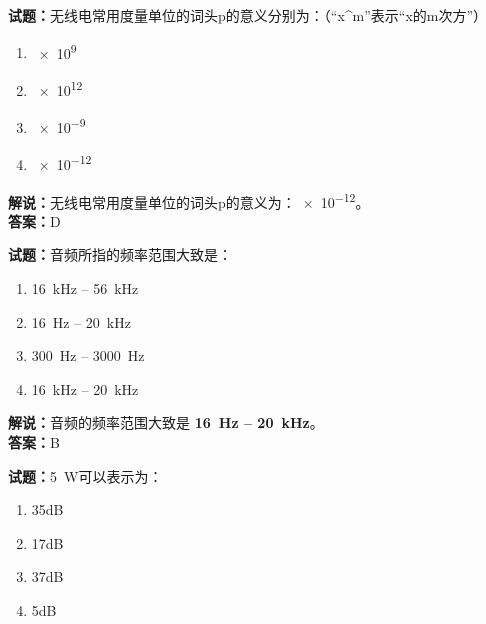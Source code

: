 \documentclass{ctexbook}
\begin{document}
\vspace{\baselineskip}

\noindent\textbf{试题：}无线电常用度量单位的词头p的意义分别为：（“x\string^m”表示“x的m次方”）

\begin{enumerate}[leftmargin=3em]
  \item \num{e9}%
  \item \num{e12}%
  \item \num{e-9}%
  \item \num{e-12}%
\end{enumerate}

\noindent\textbf{解说：}无线电常用度量单位的词头p的意义为：\num{e-12}。\\
\noindent\textbf{答案：}D

\vspace{\baselineskip}

\noindent\textbf{试题：}音频所指的频率范围大致是：

\begin{enumerate}[leftmargin=3em]
  \item \qty{16}{\kHz} -- \qty{56}{\kHz}
  \item \qty{16}{\hertz} -- \qty{20}{\kHz}
  \item \qty{300}{\hertz} -- \qty{3000}{\hertz}
  \item \qty{16}{\kHz} -- \qty{20}{\kHz}
\end{enumerate}

\noindent\textbf{解说：}音频的频率范围大致是 \textbf{\qty{16}{\hertz} -- \qty{20}{\kHz}}。\\\noindent\textbf{答案：}B

\vspace{\baselineskip}

\noindent\textbf{试题：}\qty{5}{\watt}可以表示为：

\begin{enumerate}[leftmargin=3em]
  \item \num{35}\unit[qualifier-mode=combine]{\deci\bel{}}
  \item \num{17}\unit[qualifier-mode=combine]{\deci\bel{}}
  \item \num{37}\unit[qualifier-mode=combine]{\deci\bel{}}
  \item \num{5}\unit[qualifier-mode=combine]{\deci\bel{}}
\end{enumerate}
\end{document}
